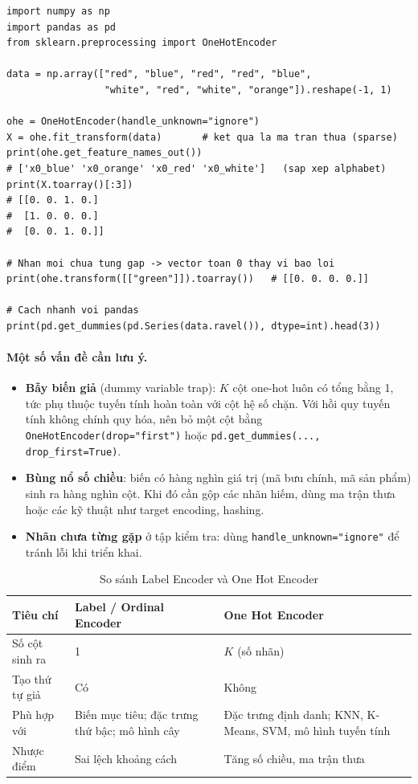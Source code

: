 \begin{lstlisting}[caption={One Hot Encoder với scikit-learn và pandas}]
import numpy as np
import pandas as pd
from sklearn.preprocessing import OneHotEncoder

data = np.array(["red", "blue", "red", "red", "blue",
                 "white", "red", "white", "orange"]).reshape(-1, 1)

ohe = OneHotEncoder(handle_unknown="ignore")
X = ohe.fit_transform(data)       # ket qua la ma tran thua (sparse)
print(ohe.get_feature_names_out())
# ['x0_blue' 'x0_orange' 'x0_red' 'x0_white']   (sap xep alphabet)
print(X.toarray()[:3])
# [[0. 0. 1. 0.]
#  [1. 0. 0. 0.]
#  [0. 0. 1. 0.]]

# Nhan moi chua tung gap -> vector toan 0 thay vi bao loi
print(ohe.transform([["green"]]).toarray())   # [[0. 0. 0. 0.]]

# Cach nhanh voi pandas
print(pd.get_dummies(pd.Series(data.ravel()), dtype=int).head(3))
\end{lstlisting}

\paragraph{Một số vấn đề cần lưu ý.}
\begin{itemize}
    \item \textbf{Bẫy biến giả} (dummy variable trap): $K$ cột one-hot luôn có tổng bằng 1, tức phụ thuộc tuyến tính hoàn toàn với cột hệ số chặn. Với hồi quy tuyến tính không chính quy hóa, nên bỏ một cột bằng \texttt{OneHotEncoder(drop="first")} hoặc \texttt{pd.get\_dummies(..., drop\_first=True)}.
    \item \textbf{Bùng nổ số chiều}: biến có hàng nghìn giá trị (mã bưu chính, mã sản phẩm) sinh ra hàng nghìn cột. Khi đó cần gộp các nhãn hiếm, dùng ma trận thưa hoặc các kỹ thuật như target encoding, hashing.
    \item \textbf{Nhãn chưa từng gặp} ở tập kiểm tra: dùng \texttt{handle\_unknown="ignore"} để tránh lỗi khi triển khai.
\end{itemize}

\begin{table}[H]
\centering
\begin{tabular}{|p{3.6cm}|p{4.6cm}|p{4.6cm}|}
\hline
\textbf{Tiêu chí} & \textbf{Label / Ordinal Encoder} & \textbf{One Hot Encoder} \\
\hline
Số cột sinh ra & 1 & $K$ (số nhãn) \\
\hline
Tạo thứ tự giả & Có & Không \\
\hline
Phù hợp với & Biến mục tiêu; đặc trưng thứ bậc; mô hình cây & Đặc trưng định danh; KNN, K-Means, SVM, mô hình tuyến tính \\
\hline
Nhược điểm & Sai lệch khoảng cách & Tăng số chiều, ma trận thưa \\
\hline
\end{tabular}
\caption{So sánh Label Encoder và One Hot Encoder}
\end{table}

